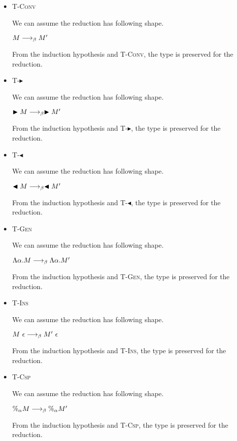 \documentclass[9pt, a4paper]{extarticle}
\theoremstyle{break}
\newcommand{\TB}{\blacktriangleright}
\newcommand{\TBL}{\blacktriangleleft}
\newcommand{\TAbs}{\textsc{T-Abs}}
\newcommand{\TConv}{\textsc{T-Conv}}
\newcommand{\TTB}{\textsc{T-$\TB$}}
\newcommand{\TTBL}{\textsc{T-$\TBL$}}
\newcommand{\TGen}{\textsc{T-Gen}}
\newcommand{\TIns}{\textsc{T-Ins}}
\newcommand{\TCsp}{\textsc{T-Csp}}
\begin{document}
\begin{itemize}
        $\lambda x:\sigma.M \LB \lambda x:\sigma.M'$

        From the induction hypothesis and \TAbs, the type is preserved for the reduction.


    \item \TConv
    
        We can assume the reduction has following shape.
        
        $M \longrightarrow_{\beta} M'$

        From the induction hypothesis and \TConv, the type is preserved for the reduction.

    \item \TTB
    
        We can assume the reduction has following shape.
        
        $\TB M \LB \TB M'$

        From the induction hypothesis and \TTB, the type is preserved for the reduction.

    \item \TTBL
    
        We can assume the reduction has following shape.
        
        $\TBL M \LB \TBL M'$

        From the induction hypothesis and \TTBL, the type is preserved for the reduction.

    \item \TGen
    
        We can assume the reduction has following shape.
        
        $\Lambda\alpha. M \longrightarrow_{\beta} \Lambda\alpha. M'$

        From the induction hypothesis and \TGen, the type is preserved for the reduction.

    \item \TIns
    
        We can assume the reduction has following shape.
        
        $M\ \epsilon \longrightarrow_{\beta} M'\ \epsilon$

        From the induction hypothesis and \TIns, the type is preserved for the reduction.

    \item \TCsp
 
        We can assume the reduction has following shape.
        
        $\%_\alpha M \longrightarrow_{\beta} \%_\alpha M'$

        From the induction hypothesis and \TCsp, the type is preserved for the reduction.

    \fi

\end{itemize}
\end{document}
